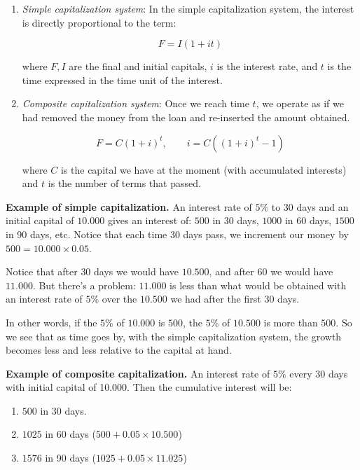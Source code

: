 \documentclass[a4paper, 12pt]{article}
\theoremstyle{definition}
\begin{document}
\begin{enumerate}
    \item \textit{Simple capitalization system}: 
In the simple capitalization system, the interest is directly proportional
to the term: 

        $$F = I (1 + i t)$$

    where $F, I$ are the final and initial capitals, $i$ is the interest rate, 
    and $t$ is the time expressed in the time unit of the interest.
    \item \textit{Composite capitalization system}: Once we reach time $t$, we
        operate as if we had removed the
        money from the loan and re-inserted the amount obtained.

        \begin{equation*}
            F = C(1+i)^t, \qquad i = C\left( (1+i)^t - 1 \right) 
        \end{equation*}

        where $C$ is the capital we have at the moment (with accumulated
        interests) and $t$ is the number of terms that passed. 
\end{enumerate}


\begin{shaded}
    \textbf{Example of simple capitalization.} An interest rate of $5\%$ to 30
    days and an initial capital of $10.000$ gives an interest of: $500$ in 30
    days, $1000$ in 60 days, $1500$ in 90 days, etc. Notice that each time 30
    days pass, we increment our money by $500 = 10.000 \times 0.05$.

    Notice that after $30$ days we would have $10.500$, and after $60$ we would
    have $11.000$. But there's a problem: $11.000$ is less than what would be 
    obtained with an interest rate of $5\%$ over the $10.500$ we had after the
    first $30$ days.

    In other words, if the $5\%$ of $10.000$ is $500$, the $5\%$ of $10.500$ is
    more than $500$. So we see that as time goes by, with the simple
    capitalization system, the growth becomes less and less relative to 
    the capital at hand.
\end{shaded}

\begin{shaded}
    \textbf{Example of composite capitalization.} An interest rate of $5\%$
    every 30 days with initial capital of 10.000. Then the cumulative interest
    will be: 

    \begin{enumerate}
        \item $500$ in 30 days. 
        \item $1025$ in 60 days ($500 + 0.05 \times 10.500$)
        \item $1576$ in 90 days ($1025 + 0.05 \times 11.025$)
    \end{enumerate}
\end{shaded}
\end{document}
